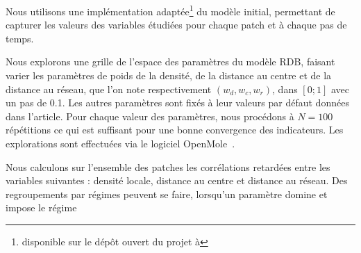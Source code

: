\documentclass[french]{./sageo}
\begin{document}
Nous utilisons une implémentation adaptée\footnote{disponible sur le dépôt ouvert du projet à \texttt{}} du modèle initial, permettant de capturer les valeurs des variables étudiées pour chaque patch et à chaque pas de temps.

Nous explorons une grille de l'espace des paramètres du modèle RDB, faisant varier les paramètres de poids de la densité, de la distance au centre et de la distance au réseau, que l'on note respectivement $(w_{d},w_{c},w_{r})$, dans $\left[0;1\right]$ avec un pas de 0.1. Les autres paramètres sont fixés à leur valeurs par défaut données dans l'article. Pour chaque valeur des paramètres, nous procédons à $N=100$ répétitions ce qui est suffisant pour une bonne convergence des indicateurs. Les explorations sont effectuées via le logiciel OpenMole~\cite{reuillon2013openmole}.

Nous calculons sur l'ensemble des patches les corrélations retardées entre les variables suivantes : densité locale, distance au centre et distance au réseau. Des regroupements par régimes peuvent se faire, lorsqu'un paramètre domine et impose le régime
\end{document}
